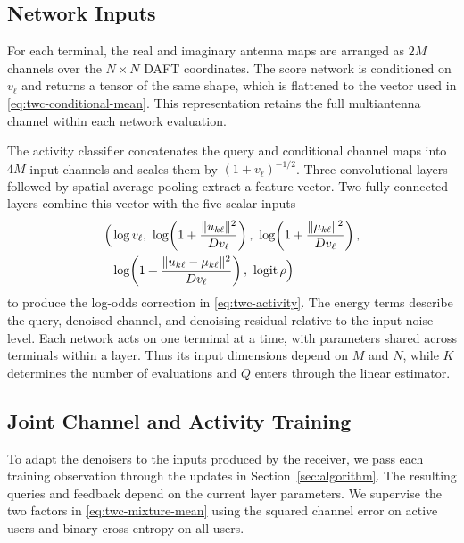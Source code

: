 \subsection{Network Inputs}

For each terminal, the real and imaginary antenna maps are arranged
as $2M$ channels over the $N\times N$ DAFT coordinates. The score
network is conditioned on $v_\ell$ and returns a tensor of the same
shape, which is flattened to the vector used in
\eqref{eq:twc-conditional-mean}. This representation retains the full
multiantenna channel within each network evaluation.

The activity classifier concatenates the query and conditional
channel maps into $4M$ input channels and scales them by
$(1+v_\ell)^{-1/2}$. Three convolutional layers followed by spatial
average pooling extract a feature vector. Two fully connected layers
combine this vector with the five scalar inputs
\begin{equation}
 \begin{aligned}
 \Big(&\log v_\ell,\
 \log\!\left(1+\frac{\|u_{k\ell}\|^2}{Dv_\ell}\right),\
 \log\!\left(1+\frac{\|\mu_{k\ell}\|^2}{Dv_\ell}\right),\\
 &\log\!\left(1+\frac{\|u_{k\ell}-\mu_{k\ell}\|^2}{Dv_\ell}\right),\
 \operatorname{logit}\rho\Big)
 \end{aligned}
 \label{eq:twc-classifier-features}
\end{equation}
to produce the log-odds correction in \eqref{eq:twc-activity}.
The energy terms describe the query, denoised channel, and denoising
residual relative to the input noise level. Each network acts on
one terminal at a time, with parameters shared across terminals
within a layer. Thus its input dimensions depend on $M$ and $N$,
while $K$ determines the number of evaluations and $Q$ enters through
the linear estimator.

\subsection{Joint Channel and Activity Training}

To adapt the denoisers to the inputs produced by the receiver, we
pass each training observation through the updates in
Section~\ref{sec:algorithm}.
The resulting queries and feedback depend on the current layer
parameters. We supervise the two factors in
\eqref{eq:twc-mixture-mean} using the squared channel error on active
users and binary cross-entropy on all users.


